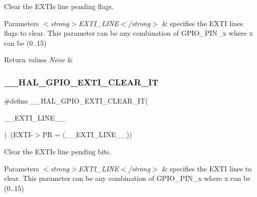 Clear the E\+X\+TI\textquotesingle{}s line pending flags. 


\begin{DoxyParams}{Parameters}
{\em $<$strong$>$\+E\+X\+T\+I\+\_\+\+L\+I\+N\+E$<$/strong$>$} & specifies the E\+X\+TI lines flags to clear. This parameter can be any combination of G\+P\+I\+O\+\_\+\+P\+I\+N\+\_\+x where x can be (0..15) \\
\hline
\end{DoxyParams}

\begin{DoxyRetVals}{Return values}
{\em None} & \\
\hline
\end{DoxyRetVals}
\mbox{\label{group___g_p_i_o___exported___macros_ga2a086506eec826f49b200fba64beb9f1}} 
\subsubsection{\texorpdfstring{\+\_\+\+\_\+\+H\+A\+L\+\_\+\+G\+P\+I\+O\+\_\+\+E\+X\+T\+I\+\_\+\+C\+L\+E\+A\+R\+\_\+\+IT}{\_\_HAL\_GPIO\_EXTI\_CLEAR\_IT}}
{\footnotesize\ttfamily \#define \+\_\+\+\_\+\+H\+A\+L\+\_\+\+G\+P\+I\+O\+\_\+\+E\+X\+T\+I\+\_\+\+C\+L\+E\+A\+R\+\_\+\+IT(\begin{DoxyParamCaption}\item[{}]{\+\_\+\+\_\+\+E\+X\+T\+I\+\_\+\+L\+I\+N\+E\+\_\+\+\_\+ }\end{DoxyParamCaption})~(E\+X\+TI-\/$>$PR = (\+\_\+\+\_\+\+E\+X\+T\+I\+\_\+\+L\+I\+N\+E\+\_\+\+\_\+))}



Clear the E\+X\+TI\textquotesingle{}s line pending bits. 


\begin{DoxyParams}{Parameters}
{\em $<$strong$>$\+E\+X\+T\+I\+\_\+\+L\+I\+N\+E$<$/strong$>$} & specifies the E\+X\+TI lines to clear. This parameter can be any combination of G\+P\+I\+O\+\_\+\+P\+I\+N\+\_\+x where x can be (0..15) \\
\hline
\end{DoxyParams}

